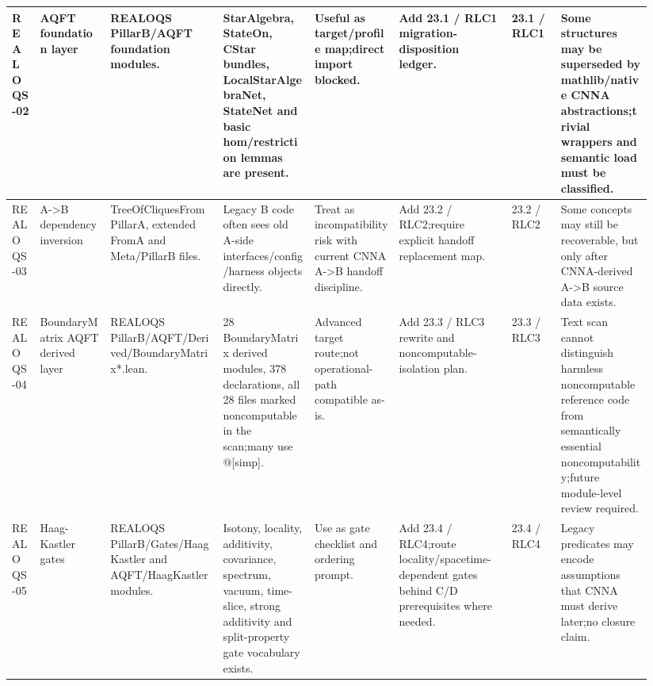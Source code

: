 \begin{longtable}{L{0.04\linewidth} L{0.105\linewidth} L{0.16\linewidth} L{0.13\linewidth} L{0.125\linewidth} L{0.165\linewidth} L{0.075\linewidth} L{0.135\linewidth}}
\hline
\addlinespace[0.24em]
REALOQS-02 & AQFT foundation layer & REALOQS PillarB/\allowbreak{}AQFT foundation modules. & StarAlgebra, StateOn, CStar bundles, LocalStarAlgebraNet, StateNet and basic hom/\allowbreak{}restriction lemmas are present. & Useful as target/\allowbreak{}profile map;\newline direct import blocked. & Add 23.1 /\allowbreak{} RLC1 migration-disposition ledger. & 23.1 /\allowbreak{} RLC1 & Some structures may be superseded by mathlib/\allowbreak{}native CNNA abstractions;\newline trivial wrappers and semantic load must be classified.\\
\hline
\addlinespace[0.24em]
REALOQS-03 & A->B dependency inversion & TreeOfCliquesFromPillarA, extended FromA and Meta/\allowbreak{}PillarB files. & Legacy B code often sees old A-side interfaces/\allowbreak{}config/\allowbreak{}harness objects directly. & Treat as incompatibility risk with current CNNA A->B handoff discipline. & Add 23.2 /\allowbreak{} RLC2;\newline require explicit handoff replacement map. & 23.2 /\allowbreak{} RLC2 & Some concepts may still be recoverable, but only after CNNA-derived A->B source data exists.\\
\hline
\addlinespace[0.24em]
REALOQS-04 & BoundaryMatrix AQFT derived layer & REALOQS PillarB/\allowbreak{}AQFT/\allowbreak{}Derived/\allowbreak{}BoundaryMatrix*.lean. & 28 BoundaryMatrix derived modules, 378 declarations, all 28 files marked noncomputable in the scan;\newline many use @[simp]. & Advanced target route;\newline not operational-path compatible as-is. & Add 23.3 /\allowbreak{} RLC3 rewrite and noncomputable-isolation plan. & 23.3 /\allowbreak{} RLC3 & Text scan cannot distinguish harmless noncomputable reference code from semantically essential noncomputability;\newline future module-level review required.\\
\hline
\addlinespace[0.24em]
REALOQS-05 & Haag-Kastler gates & REALOQS PillarB/\allowbreak{}Gates/\allowbreak{}HaagKastler and AQFT/\allowbreak{}HaagKastler modules. & Isotony, locality, additivity, covariance, spectrum, vacuum, time-slice, strong additivity and split-property gate vocabulary exists. & Use as gate checklist and ordering prompt. & Add 23.4 /\allowbreak{} RLC4;\newline route locality/\allowbreak{}spacetime-dependent gates behind C/\allowbreak{}D prerequisites where needed. & 23.4 /\allowbreak{} RLC4 & Legacy predicates may encode assumptions that CNNA must derive later;\newline no closure claim.\\

\end{longtable}
